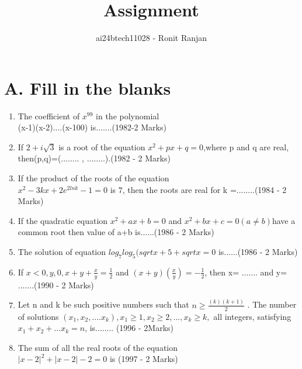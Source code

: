 \documentclass[journal,12pt,twocolumn]{IEEEtran}
\theoremstyle{remark}
\begin{document}

\vspace{3cm}

\title{Assignment}
\author{ai24btech11028 - Ronit Ranjan}
\maketitle
\newpage
\bigskip
\section*{A. Fill in the blanks}
\begin{enumerate}
    \item The coefficient of $x^{99}$ in the polynomial\\ (x-1)(x-2)....(x-100) is.......\hfill (1982-2 Marks)
      
    \item If $2+i\sqrt{3}$ is a root of the equation $x^2 + px +q =0$,where p and q are real, then(p,q)=(........ , ........).\hfill (1982 - 2 Marks)
    
    \item If the product of the roots of the equation\\ $x^2 -3kx +2e^{2lnk} -1=0$ is $7$, then the roots are real for k =........\hfill (1984 - 2 Marks)
    
    \item If the quadratic equation $x^2 + ax +b=0$ and $x^2 + bx + c=0 (a \ne b)$have a common root then value of a+b is......\hfill (1986 - 2 Marks)
    
    \item The solution of equation $log_{7}log_{5}(sqrt{x+5}+sqrt{x} = 0$ is......\hfill (1986 - 2 Marks)
    
    \item If $x<0, y,0, x + y + \frac{x}{y} = \frac{1}{2}$ and $(x+y)(\frac{x
    }{y}) = -\frac{1}{2}$, then x= ....... and y= .......\hfill (1990 - 2 Marks)
    
    \item Let n and k be such positive numbers such that $n \geq \frac{(k)(k+1)}{2}$ . The number of solutions $(x_1,x_2,....x_k), x_1 \geq 1, x_2 \geq 2,...,x_k \geq k, $ all integers, satisfying $x_1+x_2+...x_k = n$, is........  \hfill (1996 - 2Marks) 
    \item The sum of all the real roots of the equation\\$|x-2|^2+|x-2|-2 = 0$ is \hfill (1997 - 2 Marks)
\end{enumerate}
\end{document}
